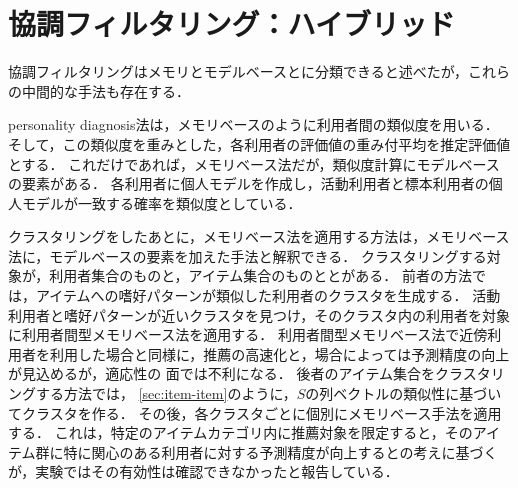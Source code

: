 \chapter{協調フィルタリング：ハイブリッド}
\label{sec:cfsummary}

協調フィルタリングはメモリとモデルベースとに分類できると述べたが，これらの中間的な手法も存在する．

personality diagnosis法\cite{uai:00:01}は，メモリベースのように利用者間の類似度を用いる．
そして，この類似度を重みとした，各利用者の評価値の重み付平均を推定評価値とする．
これだけであれば，メモリベース法だが，類似度計算にモデルベースの要素がある．
各利用者に個人モデルを作成し，活動利用者と標本利用者の個人モデルが一致する確率を類似度としている．

クラスタリングをしたあとに，メモリベース法を適用する方法は，メモリベース法に，モデルベースの要素を加えた手法と解釈できる．
クラスタリングする対象が，利用者集合のもの\cite{sigir:05:01}と，アイテム集合のものと\cite{misc:090}とがある．
前者の方法では，アイテムへの嗜好パターンが類似した利用者のクラスタを生成する．
活動利用者と嗜好パターンが近いクラスタを見つけ，そのクラスタ内の利用者を対象に利用者間型メモリベース法を適用する．
利用者間型メモリベース法で近傍利用者を利用した場合と同様に，推薦の高速化と，場合によっては予測精度の向上が見込めるが，適応性の
面では不利になる．
後者のアイテム集合をクラスタリングする方法では，
\ref{sec:item-item}のように，$S$の列ベクトルの類似性に基づいてクラスタを作る．
その後，各クラスタごとに個別にメモリベース手法を適用する．
これは，特定のアイテムカテゴリ内に推薦対象を限定すると，そのアイテム群に特に関心のある利用者に対する予測精度が向上するとの考えに基づくが，実験ではその有効性は確認できなかったと報告している．

